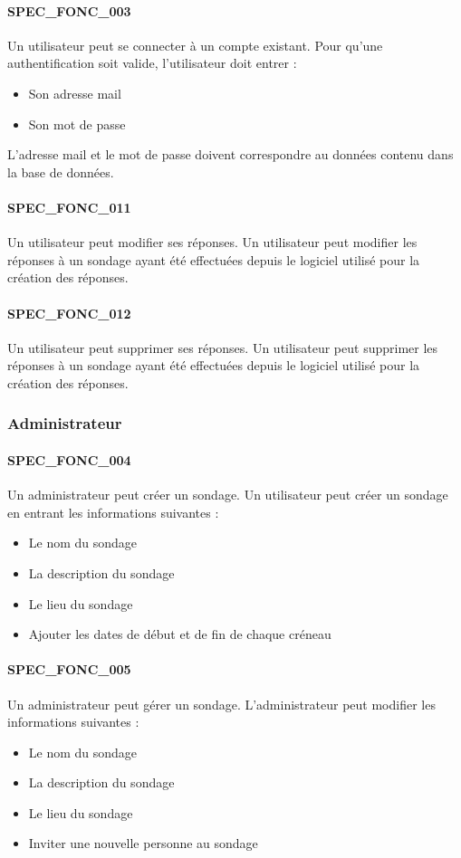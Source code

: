 \documentclass[]{report}
\begin{document}
\paragraph{SPEC\_FONC\_003} Un utilisateur peut se connecter à un compte existant.
Pour qu’une authentification soit valide, l’utilisateur doit entrer :
\begin{itemize}
\item Son adresse mail
\item Son mot de passe \end{itemize}
L’adresse mail et le mot de passe doivent correspondre au données contenu dans la base de données.

\paragraph{SPEC\_FONC\_011} Un utilisateur peut modifier ses réponses.
Un utilisateur peut modifier les réponses à un sondage ayant été effectuées depuis le logiciel utilisé pour la création des réponses.

\paragraph{SPEC\_FONC\_012} Un utilisateur peut supprimer ses réponses.
Un utilisateur peut supprimer les réponses à un sondage ayant été effectuées depuis le logiciel utilisé pour la création des réponses.

\subsubsection{Administrateur}

\paragraph{SPEC\_FONC\_004} Un administrateur peut créer un sondage.
Un utilisateur peut créer un sondage en entrant les informations suivantes :
\begin{itemize}
\item Le nom du sondage 
\item La description du sondage
\item Le lieu du sondage
\item Ajouter les dates de début et de fin de chaque créneau  \end{itemize}

\paragraph{SPEC\_FONC\_005} Un administrateur peut gérer un sondage.
L’administrateur peut modifier les informations suivantes :
\begin{itemize}
\item Le nom du sondage
\item La description du sondage
\item Le lieu du sondage
\item Inviter une nouvelle personne au sondage \end{itemize}
\end{document}
